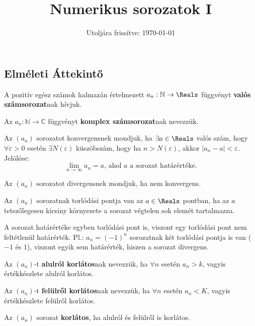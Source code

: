 \documentclass[a4paper, 12pt]{scrartcl}
\title{Numerikus sorozatok I}
\date{Utoljára frissítve: \today}
\begin{document}
\maketitle

\subsection{Elméleti Áttekintő}

\begin{definition}[Sorozat]
  A pozitív egész számok halmazán értelmezett $a_n : \mathbb N \rightarrow
    \Reals$ függvényt \textbf{valós számsorozat}nak hívjuk.

  Az $a_n:\mathbb N \rightarrow \mathbb C $ függvényt \textbf{komplex
    számsorozat}nak nevezzük.

\end{definition}

\begin{definition}[Konvergencia]
  Az $(a_n)$ sorozatot konvergensnek mondjuk, ha $\exists a \in \Reals$ valós
  szám, hogy $\forall \varepsilon > 0$ esetén $\exists N(\varepsilon)$
  küszöbszám, hogy ha $n > N(\varepsilon)$, akkor $|a_n - a| < \varepsilon$.
  Jelölése:
  \[
    \lim_{n \rightarrow \infty} a_n = a
    \text{, ahol $a$ a sorozat határértéke.}
  \]
\end{definition}

\begin{definition}[Divergencia]
  Az $(a_n)$ sorozatot divergensnek mondjuk, ha nem konvergens.
\end{definition}

\begin{definition}
  Az $(a_n)$ sorozatnak torlódási pontja van az $a \in \Reals$ pontban, ha az
  $a$ tetszőlegesen kicsiny környezete a sorozat végtelen sok elemét 
  tartalmazza.
\end{definition}

\begin{note}
  A sorozat határértéke egyben torlódási pont is, viszont egy torlódási pont nem
  feltétlenül határérték. Pl.: $a_n = (-1)^n$ sorozatnak két torlódási pontja is
  van ($-1$ és $1$), viszont egyik sem határérték, hiszen a sorozat divergens.
\end{note}

\begin{definition}
  Az $(a_n)$-t \textbf{alulról korlátos}nak nevezzük, ha $\forall n$ esetén
  $a_n > k$, vagyis értékkészlete alulról korlátos.

  Az $(a_n)$-t \textbf{felülről korlátos}nak nevezzük, ha $\forall n$ esetén
  $a_n < K$, vagyis értékkészlete felülről korlátos.

  Az $(a_n)$ sorozat \textbf{korlátos}, ha alulról és felülről is korlátos.
\end{definition}
\end{document}
